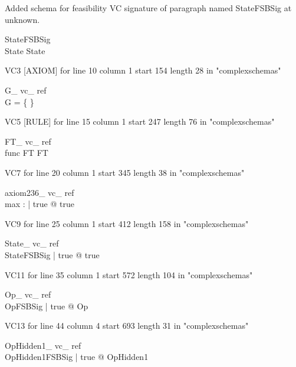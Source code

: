 \documentclass{article}
\begin{document}
Added schema for feasibility VC signature of paragraph named StateFSBSig at unknown.
\begin{schema}{StateFSBSig}
\\
 State 
\where
 State
\end{schema}

VC3 [AXIOM] for line 10 column 1 start 154 length 28 in "complexschemas"
\begin{theorem}{ G\_ vc\_ ref}\\
 \lnot G = \{ \} \\

\end{theorem}

VC5 [RULE] for line 15 column 1 start 247 length 76 in "complexschemas"
\begin{theorem}{ FT\_ vc\_ ref}\\
 func \in \nat \cross FT \inj FT \\

\end{theorem}

VC7 for line 20 column 1 start 345 length 38 in "complexschemas"
\begin{theorem}{ axiom236\_ vc\_ ref}\\
 \exists max : \nat | true @ true \\

\end{theorem}

VC9 for line 25 column 1 start 412 length 158 in "complexschemas"
\begin{theorem}{ State\_ vc\_ ref}\\
 \exists StateFSBSig | true @ true \\

\end{theorem}

VC11 for line 35 column 1 start 572 length 104 in "complexschemas"
\begin{theorem}{ Op\_ vc\_ ref}\\
 \forall OpFSBSig | true @ \pre Op \\

\end{theorem}

VC13 for line 44 column 4 start 693 length 31 in "complexschemas"
\begin{theorem}{ OpHidden1\_ vc\_ ref}\\
 \forall OpHidden1FSBSig | true @ \pre OpHidden1 \\

\end{theorem}
\end{document}
